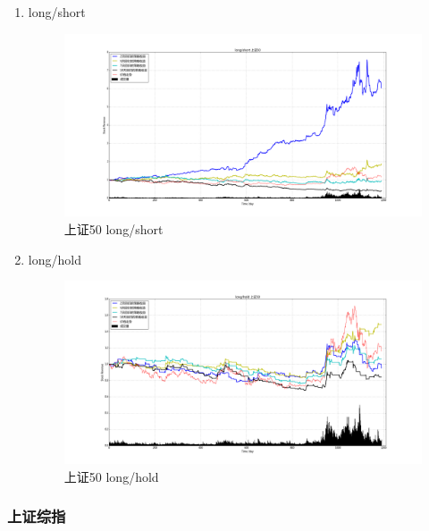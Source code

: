 \documentclass[12pt,a4paper]{article}
\begin{document}
\begin{enumerate}
\item long/short 
\begin{figure}[H]
	\centering
	\includegraphics[width=1.0\textwidth]{img_r_2/sz50.png}
	\caption{上证50 long/short}
\end{figure}

\item long/hold 
\begin{figure}[H]
	\centering
	\includegraphics[width=1.0\textwidth]{img_r_2/sz50_1.png}
	\caption{上证50 long/hold}
\end{figure}
\end{enumerate}

\subsubsection{上证综指}
\end{document}
